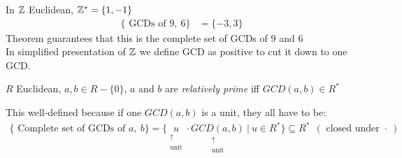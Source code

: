 \begin{example}
    In ${\mathbb{Z}}$ Euclidean, ${\mathbb{Z}}^*=\{1,-1\}$
    \begin{align*}
        \{\text{ GCDs of }9, \ 6\}&= \{-3,3\}
    \end{align*}
    Theorem guarantees that this is the complete set of GCDs of $9$ and $6$ \\ \steezybreak
    In simplified presentation of ${\mathbb{Z}}$ we define GCD as positive to cut it down to one GCD.
\end{example}

\begin{definition}
    $R$ Euclidean, $a,b \in R-\{0\}$, $a$ and $b$ are \textit{relatively prime} iff
    $GCD(a,b)\in R^*$
\end{definition}
This well-defined because if one $GCD(a,b)$ is a unit, they all have to be:
\begin{align*}
    \{\text{ Complete set of GCDs of }a, \ b\}= \{\underset{\substack{\uparrow \\ \text{unit}}}{u}\cdot \underset{\substack{\uparrow \\ \text{unit}}}{GCD(a,b)} \ | \ u\in R^* \} \subseteq R^* \ \ (\text{ closed under }\cdot \ )
\end{align*}

